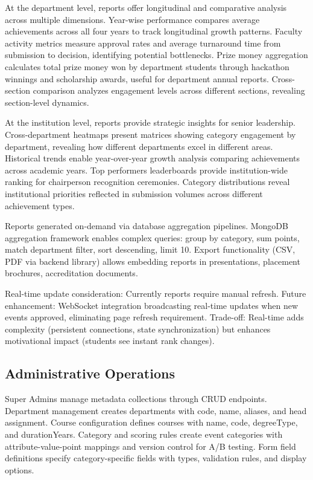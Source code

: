 \documentclass[conference]{IEEEtran}
\begin{document}
At the department level, reports offer longitudinal and comparative analysis across multiple dimensions. Year-wise performance compares average achievements across all four years to track longitudinal growth patterns. Faculty activity metrics measure approval rates and average turnaround time from submission to decision, identifying potential bottlenecks. Prize money aggregation calculates total prize money won by department students through hackathon winnings and scholarship awards, useful for department annual reports. Cross-section comparison analyzes engagement levels across different sections, revealing section-level dynamics.

At the institution level, reports provide strategic insights for senior leadership. Cross-department heatmaps present matrices showing category engagement by department, revealing how different departments excel in different areas. Historical trends enable year-over-year growth analysis comparing achievements across academic years. Top performers leaderboards provide institution-wide ranking for chairperson recognition ceremonies. Category distributions reveal institutional priorities reflected in submission volumes across different achievement types.

Reports generated on-demand via database aggregation pipelines. MongoDB aggregation framework enables complex queries: group by category, sum points, match department filter, sort descending, limit 10. Export functionality (CSV, PDF via backend library) allows embedding reports in presentations, placement brochures, accreditation documents.

Real-time update consideration: Currently reports require manual refresh. Future enhancement: WebSocket integration broadcasting real-time updates when new events approved, eliminating page refresh requirement. Trade-off: Real-time adds complexity (persistent connections, state synchronization) but enhances motivational impact (students see instant rank changes).

\subsection{Administrative Operations}
Super Admins manage metadata collections through CRUD endpoints. Department management creates departments with code, name, aliases, and head assignment. Course configuration defines courses with name, code, degreeType, and durationYears. Category and scoring rules create event categories with attribute-value-point mappings and version control for A/B testing. Form field definitions specify category-specific fields with types, validation rules, and display options.
\end{document}
